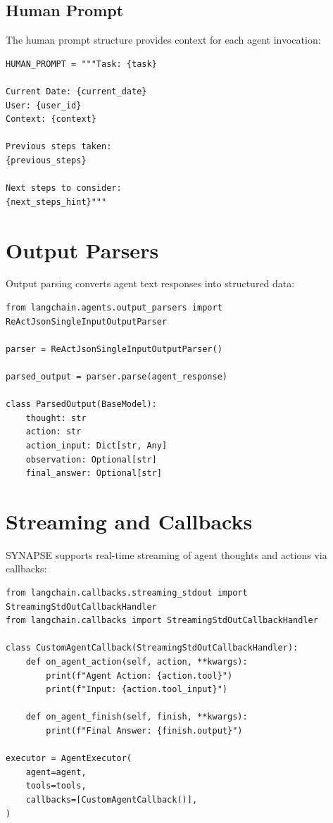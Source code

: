 \documentclass{report}
\begin{document}
\subsection{Human Prompt}

The human prompt structure provides context for each agent invocation:

\begin{lstlisting}
HUMAN_PROMPT = """Task: {task}

Current Date: {current_date}
User: {user_id}
Context: {context}

Previous steps taken:
{previous_steps}

Next steps to consider:
{next_steps_hint}"""
\end{lstlisting}

\section{Output Parsers}

Output parsing converts agent text responses into structured data:

\begin{lstlisting}
from langchain.agents.output_parsers import ReActJsonSingleInputOutputParser

parser = ReActJsonSingleInputOutputParser()

parsed_output = parser.parse(agent_response)

class ParsedOutput(BaseModel):
    thought: str
    action: str
    action_input: Dict[str, Any]
    observation: Optional[str]
    final_answer: Optional[str]
\end{lstlisting}

\section{Streaming and Callbacks}

SYNAPSE supports real-time streaming of agent thoughts and actions via callbacks:

\begin{lstlisting}
from langchain.callbacks.streaming_stdout import StreamingStdOutCallbackHandler
from langchain.callbacks import StreamingStdOutCallbackHandler

class CustomAgentCallback(StreamingStdOutCallbackHandler):
    def on_agent_action(self, action, **kwargs):
        print(f"Agent Action: {action.tool}")
        print(f"Input: {action.tool_input}")
    
    def on_agent_finish(self, finish, **kwargs):
        print(f"Final Answer: {finish.output}")

executor = AgentExecutor(
    agent=agent,
    tools=tools,
    callbacks=[CustomAgentCallback()],
)
\end{lstlisting}
\end{document}
